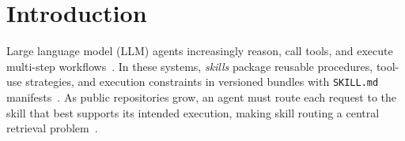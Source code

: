 \documentclass[letterpaper]{article} %
\begin{document}

\section{Introduction}
\label{sec:intro}
Large language model (LLM) agents increasingly reason, call tools, and execute multi-step workflows~\citep{yao2023react,schick2024toolformer,shen2023hugginggpt}. In these systems, \emph{skills} package reusable procedures, tool-use strategies, and execution constraints in versioned bundles with \texttt{SKILL.md} manifests~\citep{openai2026skills,zheng2026skillrouter}. As public repositories grow, an agent must route each request to the skill that best supports its intended execution, making skill routing a central retrieval problem~\citep{li2025skillflow,zheng2026skillrouter}.

\end{document}
